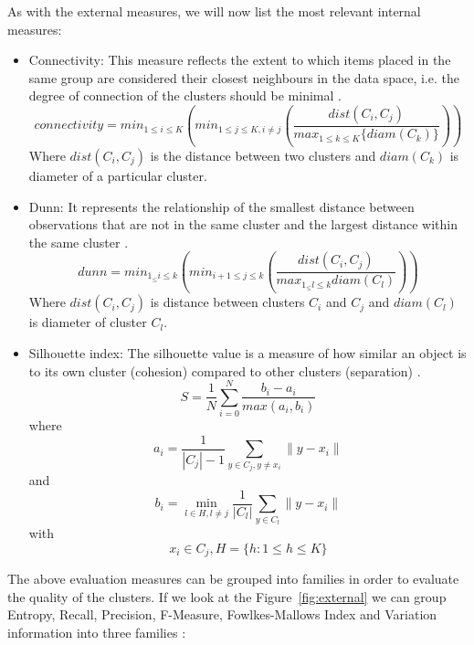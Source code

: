 As with the external measures, we will now list the most relevant internal measures:
\begin{itemize}
    \item Connectivity: This measure reflects the extent to which items placed in the same group are considered their closest neighbours in the data space, i.e. the degree of connection of the clusters should be minimal \citep{b39}.
    \begin{equation}
        connectivity = min_{ 1\leq i \leq K} \left( min_{1\leq j \leq K, i\not= j} \left( \frac{dist(C_i,C_j)}{max_{1\leq k \leq K} \lbrace diam(C_k) \rbrace }  \right) \right)
    \end{equation}
    Where $dist(C_i,C_j)$ is the distance between two clusters and $diam(C_k)$ is diameter of a particular cluster.
    \item Dunn: It represents the relationship of the smallest distance between observations that are not in the same cluster and the largest distance within the same cluster \citep{b44}.
    \begin{equation}
    dunn =  min_{1_\leq i\leq k} \left( min_{i+1\leq j \leq k}  \left( \frac{dist(C_i,C_j)}{max_{1_\leq l \leq k} diam(C_{l})} \right) \right)
    \end{equation}
    Where $dist(C_{i},C_{j})$ is distance between clusters $C_{i}$ and $C_{j}$ and $diam(C_{l})$ is diameter of cluster $C_{l}$.
    \item Silhouette index: The silhouette value is a measure of how similar an object is to its own cluster (cohesion) compared to other clusters (separation) \citep{b45}.
    \begin{equation}
        S = \frac{1}{N}\sum_{i=0}^{N}\frac{b_{i} - a_{i}}{max(a_{i},b_{i})}
    \end{equation}
    where $$a_{i}=\frac{1}{|C_{j}| - 1} \sum_{y\in C_{j},y\neq x_{i}}^{}\|y-x_{i}\|$$ and
    $$ b_{i} = \min\limits_{l \in H, l\neq j}^{} \frac{1}{|C_{l}|} \sum_{y \in C_{l}}^{} \| y - x_{i} \| $$ with
    $$ x_{i} \in C_{j}, H = \{h: 1 \leq h \leq K\}$$
\end{itemize}

The above evaluation measures can be grouped into families in order to evaluate the quality of the clusters. If we look at the Figure~\ref{fig:external} we can group Entropy, Recall, Precision, F-Measure, Fowlkes-Mallows Index and Variation information into three families \citep{b54}:

